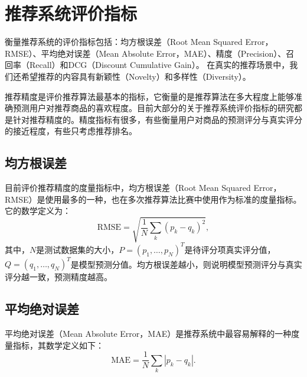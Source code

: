 \section{推荐系统评价指标}
衡量推荐系统的评价指标包括：均方根误差（Root Mean Squared Error，RMSE）、平均绝对误差（Mean Absolute Error，MAE）\cite{jensen2003reducing}、精度（Precision）、召回率（Recall）和DCG（Discount Cumulative Gain）。 在真实的推荐场景中，我们还希望推荐的内容具有新颖性（Novelty）和多样性（Diversity）。

推荐精度是评价推荐算法最基本的指标，它衡量的是推荐算法在多大程度上能够准确预测用户对推荐商品的喜欢程度。目前大部分的关于推荐系统评价指标的研究都是针对推荐精度的。精度指标有很多，有些衡量用户对商品的预测评分与真实评分的接近程度，有些只考虑推荐排名\cite{zhu2012recmetric}。

\subsection{均方根误差}
目前评价推荐精度的度量指标中，均方根误差（Root Mean Squared Error，RMSE）是使用最多的一种，也在多次推荐算法比赛中使用作为标准的度量指标。它的数学定义为：
\begin{equation}\label{eq:rmse}
    \text{RMSE} = \sqrt{\frac{1}{N}\sum\limits_k (p_k - q_k)^2},
\end{equation}
其中，$N$是测试数据集的大小，$P=(p_1,\ldots, p_N)^T$是待评分项真实评分值，$Q=(q_1,\ldots, q_N)^T$是模型预测分值。均方根误差越小，则说明模型预测评分与真实评分越一致，预测精度越高。

\subsection{平均绝对误差}
平均绝对误差（Mean Absolute Error，MAE）是推荐系统中最容易解释的一种度量指标，其数学定义如下：
\begin{equation}\label{eq:mae}
    \text{MAE} = \frac{1}{N} \sum\limits_k |p_k - q_k|.
\end{equation}

